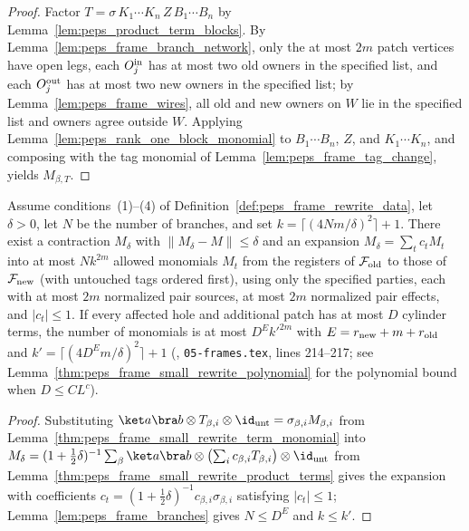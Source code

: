 \begin{proof}\leanok
    Factor $T=\sigma\,K_1\cdots K_n\,Z\,B_1\cdots B_n$ by
    Lemma~\ref{lem:peps_product_term_blocks}. By Lemma~\ref{lem:peps_frame_branch_network}, only the at most $2m$ patch vertices have open legs, each $O^{\rm in}_j$ has at most two old owners in the specified list, and each $O^{\rm out}_j$ has at most two new owners in the specified list; by Lemma~\ref{lem:peps_frame_wires}, all old and new owners on $W$ lie in the specified list and owners agree outside $W$. Applying
    Lemma~\ref{lem:peps_rank_one_block_monomial} to $B_1\cdots B_n$, $Z$, and $K_1\cdots K_n$, and composing with the tag monomial of
    Lemma~\ref{lem:peps_frame_tag_change}, yields $M_{\beta,T}$.
\end{proof}

\begin{lemma}
    \label{thm:peps_frame_small_rewrite_monomials}
    \leanok
    Assume conditions~(1)--(4) of Definition~\ref{def:peps_frame_rewrite_data}, let $\delta>0$, let $N$ be the
    number of branches, and set $k=\lceil(4Nm/\delta)^2\rceil+1$. There exist a
    contraction $M_\delta$ with $\lVert M_\delta-M\rVert\le\delta$ and an
    expansion $M_\delta=\sum_tc_tM_t$ into at most $Nk^{2m}$ allowed monomials
    $M_t$ from the registers of $\mathcal F_{\rm old}$ to those of
    $\mathcal F_{\rm new}$ (with untouched tags ordered first), using only the specified parties, each with at
    most $2m$ normalized pair sources, at most $2m$ normalized pair
    effects, and $\lvert c_t\rvert\le1$. If every affected hole and
    additional patch has at most $D$ cylinder terms, the number of monomials
    is at most $D^Ek'^{2m}$ with $E=r_{\rm new}+m+r_{\rm old}$ and
    $k'=\lceil(4D^Em/\delta)^2\rceil+1$ (\cite[Lemma~6.3]{OpenAI2026PolynomialPEPS}, \texttt{05-frames.tex},
    lines 214--217; see Lemma~\ref{thm:peps_frame_small_rewrite_polynomial} for the polynomial bound when $D\le CL^c$).
\end{lemma}

\begin{proof}\leanok
    Substituting $\ket a\bra b\otimes T_{\beta,i}\otimes\id_{\rm unt}=\sigma_{\beta,i}M_{\beta,i}$ from
    Lemma~\ref{thm:peps_frame_small_rewrite_term_monomial} into $M_\delta=(1+\tfrac12\delta)^{-1}\sum_\beta\ket a\bra b\otimes
        \bigl(\sum_ic_{\beta,i}T_{\beta,i}\bigr)\otimes\id_{\rm unt}$ from
    Lemma~\ref{thm:peps_frame_small_rewrite_product_terms} gives the expansion with coefficients
    $c_t=(1+\tfrac12\delta)^{-1}c_{\beta,i}\sigma_{\beta,i}$ satisfying $\lvert c_t\rvert\le1$; Lemma~\ref{lem:peps_frame_branches} gives $N\le D^E$ and $k\le k'$.
\end{proof}
